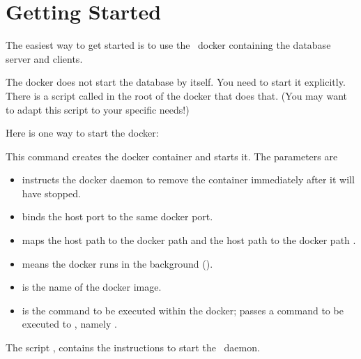 \section{Getting Started}

The easiest way to get started
is to use the \nowdb\ docker containing
the database server and clients.


The docker does not start the database by itself.
You need to start it explicitly. There is a script
called  in the root of the docker
that does that.
(You may want to adapt this script to your specific needs!)

Here is one way to start the docker:


This command creates the docker container and starts it.
The parameters are
\begin{itemize}
\item {}
instructs the docker daemon to remove
the container immediately after it will have stopped.

\item {} binds the host port 
to the same docker port.

\item {} maps the host path
 to the docker path  and
the host path  to the docker path .

\item {} means the docker runs in the background
().

\item {} is the name of the docker image.

\item {} is the command to be executed
within the docker;  passes a command
to be executed to ,
namely .
\end{itemize}

The script , contains the
instructions to start the \nowdb\ daemon.

